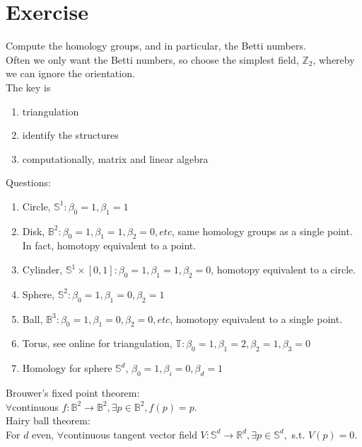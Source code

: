 \documentclass[10pt,a4paper]{article}
\begin{document}
\section{Exercise}
Compute the homology groups, and in particular, the Betti numbers.\\
Often we only want the Betti numbers, so choose the simplest field, $\mathbb{Z}_2$, whereby we can ignore the orientation.\\
The key is
\begin{enumerate}
	\item triangulation
	\item identify the structures
	\item computationally, matrix and linear algebra
\end{enumerate}
Questions:
\begin{enumerate}
	\item Circle, $\mathbb{S}^1:\beta_0=1,\beta_1=1$
	\item Disk, $\mathbb{B}^2:\beta_0=1,\beta_1=1,\beta_2=0,etc$, same homology groups as a single point. In fact, homotopy equivalent to a point.
	\item Cylinder, $\mathbb{S}^1\times [0,1]:\beta_0=1,\beta_1=1,\beta_2=0$, homotopy equivalent to a circle.
	\item Sphere, $\mathbb{S}^2:\beta_0=1,\beta_1=0,\beta_2=1$
	\item Ball, $\mathbb{B}^3:\beta_0=1,\beta_1=0,\beta_2=0,etc$, homotopy equivalent to a single point.
	\item Torus, see online for triangulation, $\mathbb{T}:\beta_0=1,\beta_1=2,\beta_2=1,\beta_3=0$
	\item Homology for sphere $\mathbb{S}^d$, $\beta_0=1,\beta_i=0,\beta_d=1$
\end{enumerate}
Brouwer's fixed point theorem:\\
$\forall$continuous $f:\mathbb{B}^2\to\mathbb{B}^2,\exists p\in\mathbb{B}^2,f(p)=p$.\\
Hairy ball theorem:\\
For $d$ even, $\forall$continuous tangent vector field $V:\mathbb{S}^d\to\mathbb{R}^d,\exists p\in\mathbb{S}^d,$ s.t. $V(p)=0$.\\
\end{document}

